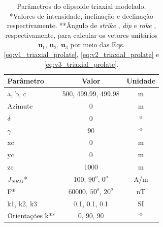 \begin{table}[h!]
	\begin{center}
		\begin{tabular}{|l|c|c|}
			\hline
			\textbf{Parâmetro}  & \textbf{Valor} & \textbf{Unidade} \\
			\hline 
			a, b, c   & 500, 499.99, 499.98 & m\\
			\hline
			Azimute   & $0$ & m\\
			\hline
			$\delta$    & $0$ & º\\
			\hline
			$\gamma$   & $90$  & º\\
			\hline
			xc   & 0  & m\\
			\hline          
			yc   & 0  & m\\
			\hline                
			zc   & 1000 & m \\
			\hline
			$J_{NRM}$*  & 100, $90^o$, $0^o$ & A/m \\
			\hline
			F*    & 60000, $50^o$, $20^o$ & nT \\
			\hline
			k1, k2, k3   & 0.1, 0.1, 0.1 & SI \\
			\hline
			Orientações k**   & $0$, $90$, $90$ & º \\
			\hline
		\end{tabular}
		\caption{Parâmetros do elipsoide triaxial modelado. *Valores de intensidade, inclinação e declinação respectivamente. **Ângulo de \textit{strike} , \textit{dip}  e \textit{rake} , respectivamente, para calcular os vetores unitários $\mathbf{u}_{1}$, $\mathbf{u}_{2}$, $\mathbf{u}_{3}$ por meio das Eqs. \ref{eq:v1_triaxial_prolate}, \ref{eq:v2_triaxial_prolate} e \ref{eq:v3_triaxial_prolate}.}
	\end{center}
	\label{tab:triaxial_oblate1}
\end{table}

\vspace{2cm}

